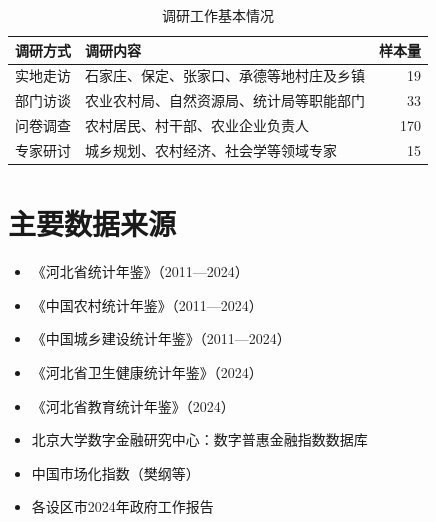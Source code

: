 \documentclass[12pt, a4paper, twoside]{ctexart}
\begin{document}
\begin{table}[H]
  \centering
  \caption{调研工作基本情况}
  \begin{tabularx}{\linewidth}{l X r}
    \toprule
    \rowcolor{TableHead}
    \color{white}\bfseries 调研方式 &
    \color{white}\bfseries 调研内容 &
    \color{white}\bfseries 样本量 \\
    \midrule
    实地走访 & 石家庄、保定、张家口、承德等地村庄及乡镇 & 19 \\
    \rowcolor{TableRow}
    部门访谈 & 农业农村局、自然资源局、统计局等职能部门 & 33 \\
    问卷调查 & 农村居民、村干部、农业企业负责人 & 170 \\
    \rowcolor{TableRow}
    专家研讨 & 城乡规划、农村经济、社会学等领域专家 & 15 \\
    \bottomrule
  \end{tabularx}
\end{table}

\section{主要数据来源}

\begin{itemize}[leftmargin=2em]
  \item 《河北省统计年鉴》（2011—2024）
  \item 《中国农村统计年鉴》（2011—2024）
  \item 《中国城乡建设统计年鉴》（2011—2024）
  \item 《河北省卫生健康统计年鉴》（2024）
  \item 《河北省教育统计年鉴》（2024）
  \item 北京大学数字金融研究中心：数字普惠金融指数数据库
  \item 中国市场化指数（樊纲等）
  \item 各设区市2024年政府工作报告
\end{itemize}
\end{document}
